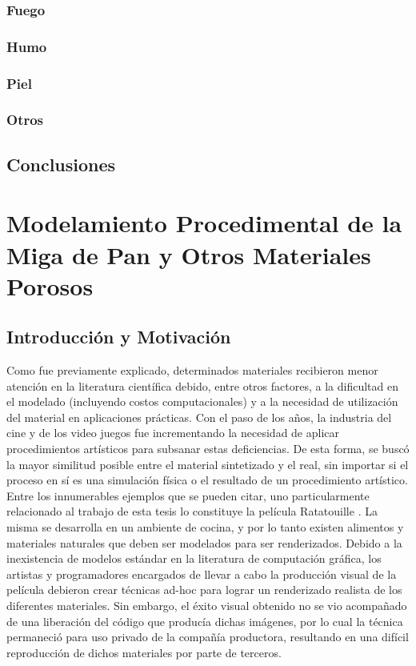 \documentclass[spanish,a4paper,11pt,oneside,links]{report}
\begin{document}
\subsection{Fuego}
\subsection{Humo}
\subsection{Piel}
\subsection{Otros}


\section{Conclusiones}

\chapter{Modelamiento Procedimental de la Miga de Pan y Otros Materiales Porosos}
\section{Introducción y Motivación} %
Como fue previamente explicado, determinados materiales recibieron menor atención en la literatura científica debido, entre otros factores, a la dificultad en el modelado (incluyendo costos computacionales) y a la necesidad de utilización del material en aplicaciones prácticas.
Con el paso de los a\~nos, la industria del cine y de los video juegos fue incrementando la necesidad de aplicar procedimientos artísticos para subsanar estas deficiencias.
De esta forma, se busc\'o la mayor similitud posible entre el material sintetizado y el real, sin importar si el proceso en sí es una simulación física o el resultado de un procedimiento artístico.
Entre los innumerables ejemplos que se pueden citar, uno particularmente relacionado al trabajo de esta tesis lo constituye la película Ratatouille \cite{Xenakis}.
La misma se desarrolla en un ambiente de cocina, y por lo tanto existen alimentos y materiales naturales que deben ser modelados para ser renderizados.
Debido a la inexistencia de modelos estándar en la literatura de computación gráfica, los artistas y programadores encargados de llevar a cabo la producción visual de la película debieron crear técnicas ad-hoc para lograr un renderizado realista de los diferentes materiales.
Sin embargo, el éxito visual obtenido no se vio acompañado de una liberación del código que producía dichas imágenes, por lo cual la técnica permaneció para uso privado de la compañía productora, resultando en una difícil reproducción de dichos materiales por parte de terceros.
\end{document}
